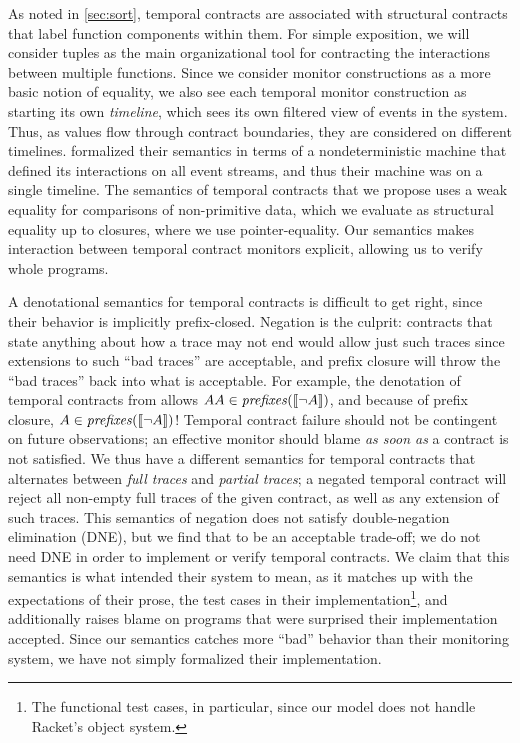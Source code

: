 %
As noted in \autoref{sec:sort}, temporal contracts are associated with structural contracts that label function components within them.
%
For simple exposition, we will consider tuples as the main organizational tool for contracting the interactions between multiple functions.
%
Since we consider monitor constructions as a more basic notion of equality, we also see each temporal monitor construction as starting its own \emph{timeline}, which sees its own filtered view of events in the system.
%
Thus, as values flow through contract boundaries, they are considered on different timelines.
%
\dfm{} formalized their semantics in terms of a nondeterministic machine that defined its interactions on all event streams, and thus their machine was on a single timeline.
%
The semantics of temporal contracts that we propose uses a weak equality for comparisons of non-primitive data, which we evaluate as structural equality up to closures, where we use pointer-equality.
%
Our semantics makes interaction between temporal contract monitors explicit, allowing us to verify whole programs.

A denotational semantics for temporal contracts is difficult to get right, since their behavior is implicitly prefix-closed.
%
Negation is the culprit: contracts that state anything about how a trace may not end would allow just such traces since extensions to such ``bad traces'' are acceptable, and prefix closure will throw the ``bad traces'' back into what is acceptable.
%
%
For example, the denotation of temporal contracts from \dfm{} allows $AA \in \mathit{prefixes}([\![ \neg A ]\!])$, and because of prefix closure, $A \in \mathit{prefixes}([\![ \neg A ]\!])$!
%
Temporal contract failure should not be contingent on future observations; an effective monitor should blame \emph{as soon as} a contract is not satisfied.
%
We thus have a different semantics for temporal contracts that alternates between \emph{full traces} and \emph{partial traces}; a negated temporal contract will reject all non-empty full traces of the given contract, as well as any extension of such traces.
%
This semantics of negation does not satisfy double-negation elimination (DNE), but we find that to be an acceptable trade-off; we do not need DNE in order to implement or verify temporal contracts.
%
We claim that this semantics is what \dfm{} intended their system to mean, as it matches up with the expectations of their prose, the test cases in their implementation\footnote{The functional test cases, in particular, since our model does not handle Racket's object system.}, and additionally raises blame on programs that \dfm{} were surprised their implementation accepted.
%
Since our semantics catches more ``bad'' behavior than their monitoring system, we have not simply formalized their implementation.

